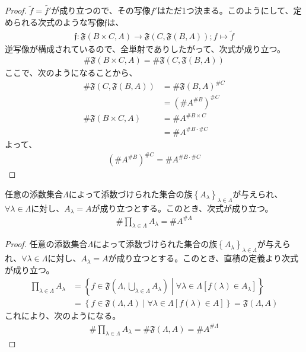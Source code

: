 \documentclass[dvipdfmx]{jsarticle}
\begin{document}
\begin{proof}
$\widetilde{f} = \widetilde{f'}$が成り立つので、その写像$f'$はただ1つ決まる。このようにして、定められる次式のような写像$\mathfrak{f}$は、
\begin{align*}
\mathfrak{f:F}(B \times C,A)\mathfrak{\rightarrow F}\left( C,\mathfrak{F}(B,A) \right);f \mapsto \widetilde{f}
\end{align*}
逆写像が構成されているので、全単射でありしたがって、次式が成り立つ。
\begin{align*}
\# {\mathfrak{F}(B \times C,A)} = \# {\mathfrak{F}\left( C,\mathfrak{F}(B,A) \right)}
\end{align*}
ここで、次のようになることから、
\begin{align*}
\# {\mathfrak{F}\left( C,\mathfrak{F}(B,A) \right)} &= {\# {\mathfrak{F}(B,A)}}^{\# C}\\
&= \left( {\# A}^{\# B} \right)^{\# C}\\
\# {\mathfrak{F}(B \times C,A)} &= {\# A}^{\# {B \times C}}\\
&= {\# A}^{\# B \cdot \# C}
\end{align*}
よって、
\begin{align*}
\left( {\# A}^{\# B} \right)^{\# C} = {\# A}^{\# B \cdot \# C}
\end{align*}
\end{proof}
\begin{thm}\label{1.2.8.9}
任意の添数集合$\varLambda$によって添数づけられた集合の族$\left\{ A_{\lambda} \right\}_{\lambda \in \varLambda}$が与えられ、$\forall\lambda \in \varLambda$に対し、$A_{\lambda} = A$が成り立つとする。このとき、次式が成り立つ。
\begin{align*}
\# {\prod_{\lambda \in \varLambda} A_{\lambda}} = {\# A}^{\# \varLambda}
\end{align*}
\end{thm}
\begin{proof}
任意の添数集合$\varLambda$によって添数づけられた集合の族$\left\{ A_{\lambda} \right\}_{\lambda \in \varLambda}$が与えられ、$\forall\lambda \in \varLambda$に対し、$A_{\lambda} = A$が成り立つとする。このとき、直積の定義より次式が成り立つ。
\begin{align*}
\prod_{\lambda \in \varLambda} A_{\lambda} &= \left\{ f \in \mathfrak{F}\left( \varLambda,\bigcup_{\lambda \in \varLambda} A_{\lambda} \right) \middle| \forall\lambda \in \varLambda\left[ f(\lambda) \in A_{\lambda} \right] \right\}\\
&= \left\{ f \in \mathfrak{F}(\varLambda,A) \middle| \forall\lambda \in \varLambda\left[ f(\lambda) \in A \right] \right\} = \mathfrak{F}(\varLambda,A)
\end{align*}
これにより、次のようになる。
\begin{align*}
\# {\prod_{\lambda \in \varLambda} A_{\lambda}} = \# {\mathfrak{F}(\varLambda,A)} = {\# A}^{\# \varLambda}
\end{align*}
\end{proof}
\end{document}
